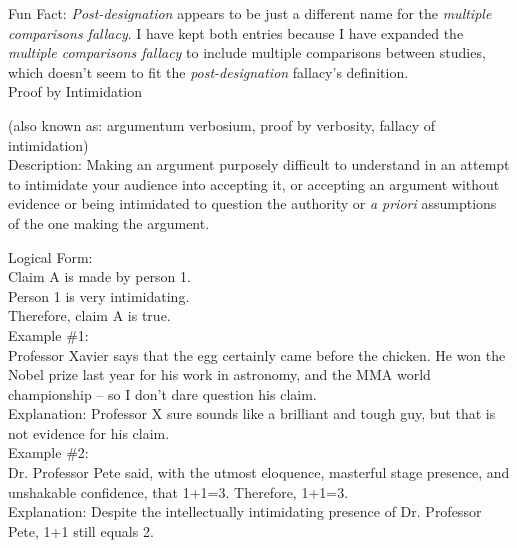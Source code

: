 \documentclass[a4paper,12pt,single,pdftex]{scrbook}
\begin{document}
    
      Fun Fact: {\em Post-designation} appears to be just a different name for the {\it multiple comparisons fallacy}. I have kept both entries because I have expanded the {\it multiple comparisons fallacy}  to include multiple comparisons between studies, which doesn’t seem to fit the {\em post-designation} fallacy’s definition.
    \\

  

Proof by Intimidation
    
      (also known as: argumentum verbosium, proof by verbosity, fallacy of intimidation)
    \\

  
    Description: Making an argument purposely difficult to understand in an attempt to intimidate your audience into accepting it, or accepting an argument without evidence or being intimidated to question the authority or {\it a priori} assumptions of the one making the argument.

    
      Logical Form:
    \\

    
      Claim A is made by person 1.
    \\

    
      Person 1 is very intimidating.
    \\

    
      Therefore, claim A is true.
    \\

    
      Example \#1:
    \\

    
      Professor Xavier says that the egg certainly came before the chicken.  He won the Nobel prize last year for his work in astronomy, and the MMA world championship -- so I don’t dare question his claim. 
    \\

    
      Explanation: Professor X sure sounds like a brilliant and tough guy, but that is not evidence for his claim.
    \\

    
      Example \#2:
    \\

    
      Dr. Professor Pete said, with the utmost eloquence, masterful stage presence, and unshakable confidence, that 1+1=3.  Therefore, 1+1=3.
    \\

    
      Explanation: Despite the intellectually intimidating presence of Dr. Professor Pete, 1+1 still equals 2.
    \\
\end{document}
